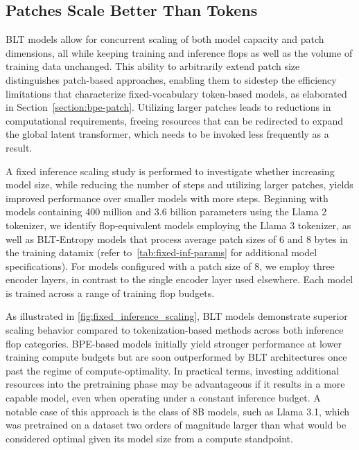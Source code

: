 \subsection{Patches Scale Better Than Tokens} {\textsc BLT} models allow for concurrent scaling of both model capacity and patch dimensions, all while keeping training and inference flops as well as the volume of training data unchanged. This ability to arbitrarily extend patch size distinguishes patch-based approaches, enabling them to sidestep the efficiency limitations that characterize fixed-vocabulary token-based models, as elaborated in Section~\ref{section:bpe-patch}. Utilizing larger patches leads to reductions in computational requirements, freeing resources that can be redirected to expand the global latent transformer, which needs to be invoked less frequently as a result.

A fixed inference scaling study is performed to investigate whether increasing model size, while reducing the number of steps and utilizing larger patches, yields improved performance over smaller models with more steps. Beginning with models containing 400 million and 3.6 billion parameters using the Llama 2 tokenizer, we identify flop-equivalent models employing the Llama 3 tokenizer, as well as {\textsc BLT}-Entropy models that process average patch sizes of 6 and 8 bytes in the training datamix (refer to~\autoref{tab:fixed-inf-params} for additional model specifications). For models configured with a patch size of 8, we employ three encoder layers, in contrast to the single encoder layer used elsewhere. Each model is trained across a range of training flop budgets.

As illustrated in \autoref{fig:fixed_inference_scaling}, {\textsc BLT} models demonstrate superior scaling behavior compared to tokenization-based methods across both inference flop categories. BPE-based models initially yield stronger performance at lower training compute budgets but are soon outperformed by {\textsc BLT} architectures once past the regime of compute-optimality. In practical terms, investing additional resources into the pretraining phase may be advantageous if it results in a more capable model, even when operating under a constant inference budget. A notable case of this approach is the class of 8B models, such as Llama 3.1, which was pretrained on a dataset two orders of magnitude larger than what would be considered optimal given its model size from a compute standpoint.

